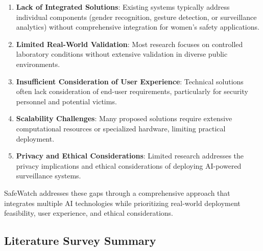\documentclass[12pt,a4paper]{article}
\begin{document}
\begin{enumerate}
    \item \textbf{Lack of Integrated Solutions}: Existing systems typically address individual components (gender recognition, gesture detection, or surveillance analytics) without comprehensive integration for women's safety applications.
    
    \item \textbf{Limited Real-World Validation}: Most research focuses on controlled laboratory conditions without extensive validation in diverse public environments.
    
    \item \textbf{Insufficient Consideration of User Experience}: Technical solutions often lack consideration of end-user requirements, particularly for security personnel and potential victims.
    
    \item \textbf{Scalability Challenges}: Many proposed solutions require extensive computational resources or specialized hardware, limiting practical deployment.
    
    \item \textbf{Privacy and Ethical Considerations}: Limited research addresses the privacy implications and ethical considerations of deploying AI-powered surveillance systems.
\end{enumerate}

SafeWatch addresses these gaps through a comprehensive approach that integrates multiple AI technologies while prioritizing real-world deployment feasibility, user experience, and ethical considerations.

\subsection{Literature Survey Summary}
\end{document}
